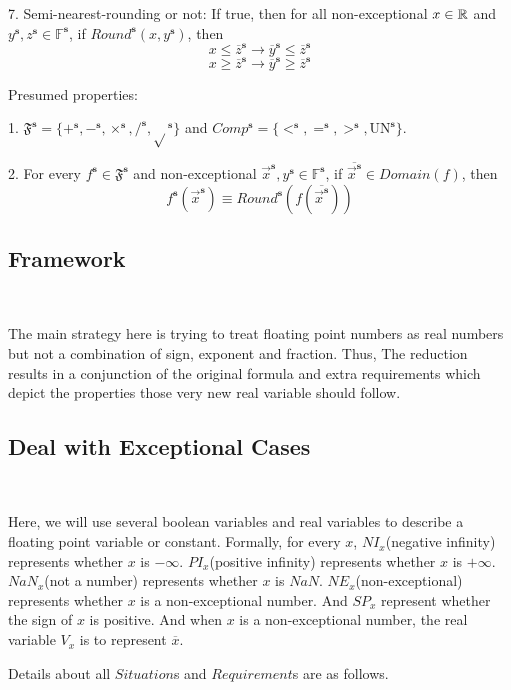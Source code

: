\documentclass[12pt]{article}
\newcommand{\F}{\mathbb{F}}
\newcommand{\s}{\mathbf{s}}
\newcommand{\OL}{\overline}
\begin{document}
7. Semi-nearest-rounding or not: If true, then for all non-exceptional $x \in \mathbb{R}$ and $y^\s, z^\s\in \F^\s$, if $Round^\s(x, y^\s)$, then $$ x \leq \OL z^\s \to \OL y^\s \leq \OL z^\s$$ $$ x \geq \OL z^\s \to \OL y^\s \geq \OL z^\s$$

Presumed properties:

1. $\mathfrak{F}^\s = \{+^\s, -^\s, \times^\s, /^\s, \sqrt{}^\s\}$ and $Comp^\s = \{<^\s, =^\s, >^\s, \text{UN}^\s \}$.

2. For every $f^\s \in \mathfrak{F}^\s$ and non-exceptional $\vec x^\s, y^\s \in \F^\s$, if $\OL {\vec x^\s} \in Domain(f)$, then $$f^\s(\vec x^\s) \equiv Round^\s(f(\OL{\vec x^\s})) $$

\subsection{Framework} \

The main strategy here is trying to treat floating point numbers as real numbers but not a combination of sign, exponent and fraction. Thus, The reduction results in a conjunction of the original formula and extra requirements which depict the properties those very new real variable should follow.

\subsection{Deal with Exceptional Cases} \

Here, we will use several boolean variables and real variables to describe a floating point variable or constant. Formally, for every $x$, $NI_x$(negative infinity) represents whether $x$ is $-\infty$. $PI_x$(positive infinity) represents whether $x$ is $+\infty$. $NaN_x$(not a number) represents whether $x$ is $NaN$. $NE_x$(non-exceptional) represents whether $x$ is a non-exceptional number. And $SP_x$ represent whether the sign of $x$ is positive. And when $x$ is a non-exceptional number, the real variable $V_x$ is to represent $\OL x$.


Details about all $Situation$s and $Requirement$s are as follows.
\end{document}
